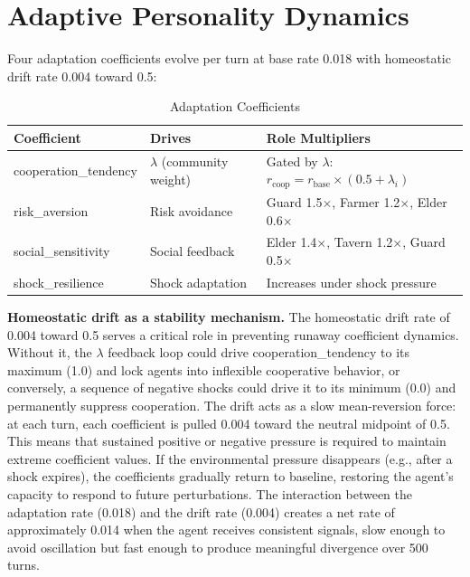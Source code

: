 \documentclass[12pt, a4paper, oneside]{report}
\begin{document}
\section{Adaptive Personality Dynamics}
\label{sec:adaptation}

Four adaptation coefficients evolve per turn at base rate 0.018 with homeostatic drift rate 0.004 toward 0.5:

\begin{table}[H]
\centering
\caption{Adaptation Coefficients}
\label{tab:adaptation}
\begin{tabular}{lll}
\toprule
\textbf{Coefficient} & \textbf{Drives} & \textbf{Role Multipliers} \\
\midrule
cooperation\_tendency & $\lambda$ (community weight) & Gated by $\lambda$: $r_{\text{coop}} = r_{\text{base}} \times (0.5 + \lambda_i)$ \\
risk\_aversion & Risk avoidance & Guard 1.5$\times$, Farmer 1.2$\times$, Elder 0.6$\times$ \\
social\_sensitivity & Social feedback & Elder 1.4$\times$, Tavern 1.2$\times$, Guard 0.5$\times$ \\
shock\_resilience & Shock adaptation & Increases under shock pressure \\
\bottomrule
\end{tabular}
\end{table}

\textbf{Homeostatic drift as a stability mechanism.}
The homeostatic drift rate of 0.004 toward 0.5 serves a critical role in preventing runaway coefficient dynamics. Without it, the $\lambda$ feedback loop could drive cooperation\_tendency to its maximum (1.0) and lock agents into inflexible cooperative behavior, or conversely, a sequence of negative shocks could drive it to its minimum (0.0) and permanently suppress cooperation. The drift acts as a slow mean-reversion force: at each turn, each coefficient is pulled 0.004 toward the neutral midpoint of 0.5. This means that sustained positive or negative pressure is required to maintain extreme coefficient values. If the environmental pressure disappears (e.g., after a shock expires), the coefficients gradually return to baseline, restoring the agent's capacity to respond to future perturbations. The interaction between the adaptation rate (0.018) and the drift rate (0.004) creates a net rate of approximately 0.014 when the agent receives consistent signals, slow enough to avoid oscillation but fast enough to produce meaningful divergence over 500 turns.
\end{document}
